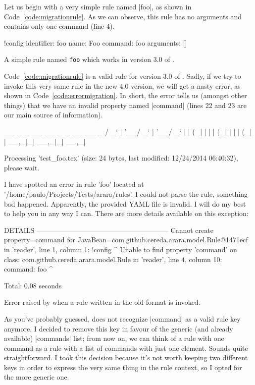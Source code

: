 \documentclass[a4paper,twoside,12pt]{memoir}
\begin{document}
Let us begin with a very simple rule named |foo|, as shown in Code~\ref{code:migrationrule}. As we can observe, this rule has no arguments and contains only one command (line 4).

\begin{code}[htbp]
\begin{codelisting}
!config
identifier: foo
name: Foo
command: foo
arguments: []
\end{codelisting}
\caption{A simple rule named \texttt{foo} which works in version 3.0 of \arara.}
\label{code:migrationrule}
\end{code}

Code~\ref{code:migrationrule} is a valid rule for version 3.0 of \arara. Sadly, if we try to invoke this very same rule in the new 4.0 version, we will get a nasty error, as shown in Code~\ref{code:errormigration}. In short, the error tells us (amongst other things) that we have an invalid property named |command| (lines 22 and 23 are our main source of information).

\begin{code}[htbp]
\begin{codelisting}
  __ _ _ __ __ _ _ __ __ _ 
 / _` | '__/ _` | '__/ _` |
| (_| | | | (_| | | | (_| |
 \__,_|_|  \__,_|_|  \__,_|

Processing 'test_foo.tex' (size: 24 bytes, last modified:
12/24/2014 06:40:32), please wait.

I have spotted an error in rule 'foo' located at
'/home/paulo/Projects/Tests/arara/rules'. I could not parse the
rule, something bad happened. Apparently, the provided YAML file
is invalid. I will do my best to help you in any way I can. There
are more details available on this exception:

DETAILS ---------------------------------------------------------
Cannot create property=command for
JavaBean=com.github.cereda.arara.model.Rule@1471ecf
 in 'reader',
line 1, column 1:
    !config
    ^
Unable to find property
'command' on class: com.github.cereda.arara.model.Rule
 in
'reader', line 4, column 10:
    command: foo
             ^

Total: 0.08 seconds
\end{codelisting}
\caption{Error raised by  when a rule written in the old format is invoked.}
\label{code:errormigration}
\end{code}

As you've probably guessed,  does not recognize |command| as a valid rule key anymore. I decided to remove this key in favour of the generic (and already available) |commands| list; from now on, we can think of a rule with one command as a rule with a list of commands with just one element. Sounds quite straightforward. I took this decision because it's not worth keeping two different keys in order to express the very same thing in the rule context, so I opted for the more generic one.
\end{document}
